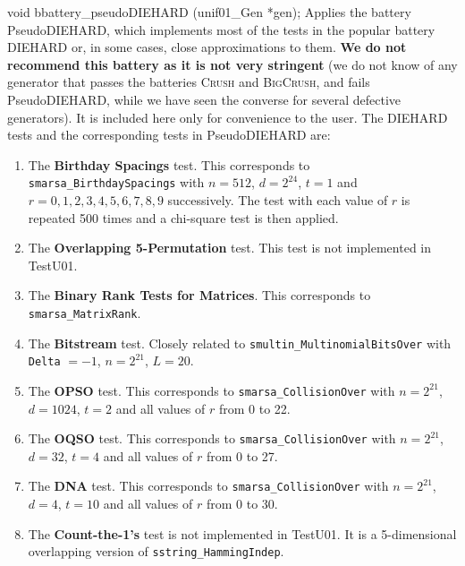 void bbattery_pseudoDIEHARD (unif01_Gen *gen);
\endcode
  \tab
  Applies the battery PseudoDIEHARD, which implements most of
  the tests in the popular battery DIEHARD \cite{rMAR96b}
  or, in some cases, close approximations to them. \textbf{We do not recommend
  this battery as it is not very stringent} (we do not know of any generator
  that passes the batteries \textsc{Crush} and  \textsc{BigCrush}, and
  fails PseudoDIEHARD, while we have seen the converse for several defective
  generators). It is included here only for convenience to the user.
  The DIEHARD tests and the corresponding tests in  PseudoDIEHARD are:
  \endtab

\begin{enumerate}

\item The {\bf Birthday Spacings} test. This corresponds
  to {\tt smarsa\_BirthdaySpacings} with $n=512$, $d=2^{24}$, $t=1$ and
  $r=0, 1, 2, 3, 4, 5, 6, 7, 8, 9$ successively. The test with each
 value of $r$ is repeated 500 times and a chi-square test is then applied.

\item The {\bf Overlapping 5-Permutation} test. This test is not
implemented in TestU01.

\item The {\bf Binary Rank Tests for Matrices}. This corresponds
 to {\tt smarsa\_MatrixRank}.

\item The {\bf Bitstream} test.  Closely related to
 {\tt smultin\_MultinomialBitsOver} with  {\tt Delta} $= -1$,
 $n=2^{21}$, $L=20$.

\item The {\bf OPSO} test. This corresponds to {\tt smarsa\_CollisionOver}
 with $n=2^{21}$, $d=1024$, $t=2$ and all values of $r$ from 0 to 22.

\item The {\bf OQSO} test. This corresponds to {\tt smarsa\_CollisionOver}
 with $n=2^{21}$, $d=32$, $t=4$ and all values of $r$ from 0 to 27.

\item The {\bf DNA} test. This corresponds to {\tt smarsa\_CollisionOver}
 with $n=2^{21}$, $d=4$, $t=10$ and all values of $r$ from 0 to 30.

\item The {\bf Count-the-1's} test is not implemented in TestU01. It is
a 5-dimensional overlapping version of {\tt sstring\_HammingIndep}.


\end{enumerate}
